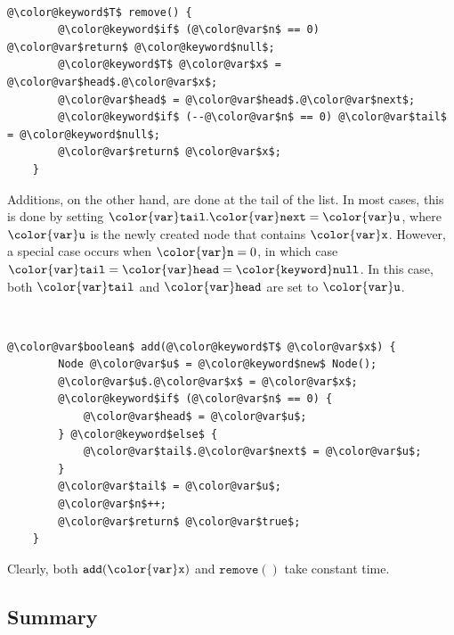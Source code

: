 \documentclass[10pt]{book}
\theoremstyle{plain}
\theoremstyle{definition}
\begin{document}
 \ \vspace{.5ex}\begin{Verbatim}[gobble=1,tabsize=2,frame=single,framerule=1.2pt,commandchars=\\@\$,label=\texttt{SLList},labelposition=topline]
	@\color@keyword$T$ remove() {
		@\color@keyword$if$ (@\color@var$n$ == 0)	@\color@var$return$ @\color@keyword$null$;
		@\color@keyword$T$ @\color@var$x$ = @\color@var$head$.@\color@var$x$;
		@\color@var$head$ = @\color@var$head$.@\color@var$next$;
		@\color@keyword$if$ (--@\color@var$n$ == 0) @\color@var$tail$ = @\color@keyword$null$;
		@\color@var$return$ @\color@var$x$;
	}	
\end{Verbatim}


Additions, on the other hand, are done at the tail of the list.  In most
cases, this is done by setting $\ensuremath{\mathtt{{\color{var}tail}.{\color{var}next}}}=\ensuremath{\mathtt{{\color{var}u}}}$, where \ensuremath{\mathtt{{\color{var}u}}} is the newly
created node that contains \ensuremath{\mathtt{{\color{var}x}}}.  However, a special case occurs when
$\ensuremath{\mathtt{{\color{var}n}}}=0$, in which case $\ensuremath{\mathtt{{\color{var}tail}}}=\ensuremath{\mathtt{{\color{var}head}}}=\ensuremath{\mathtt{{\color{keyword}null}}}$.  In this case, both \ensuremath{\mathtt{{\color{var}tail}}}
and \ensuremath{\mathtt{{\color{var}head}}} are set to \ensuremath{\mathtt{{\color{var}u}}}.



 \ \vspace{.5ex}\begin{Verbatim}[gobble=1,tabsize=2,frame=single,framerule=1.2pt,commandchars=\\@\$,label=\texttt{SLList},labelposition=topline]
	@\color@var$boolean$ add(@\color@keyword$T$ @\color@var$x$) {
		Node @\color@var$u$ = @\color@keyword$new$ Node();
		@\color@var$u$.@\color@var$x$ = @\color@var$x$;
		@\color@keyword$if$ (@\color@var$n$ == 0) {
			@\color@var$head$ = @\color@var$u$;
		} @\color@keyword$else$ {
			@\color@var$tail$.@\color@var$next$ = @\color@var$u$;
		}
		@\color@var$tail$ = @\color@var$u$;
		@\color@var$n$++;
		@\color@var$return$ @\color@var$true$;
	}
\end{Verbatim}


Clearly, both \ensuremath{\mathtt{add({\color{var}x})}} and \ensuremath{\mathtt{remove()}} take constant time.

\subsection{Summary}
\end{document}
